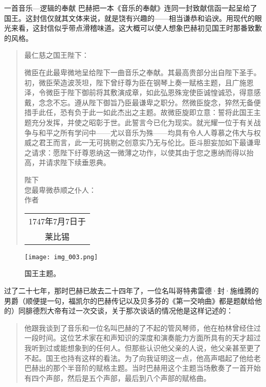 \begin{intro}{一首音乐—逻辑的奉献}
巴赫把一本《音乐的奉献》连同一封致献信函一起呈给了国王。这封信仅就其文体来说，就是饶有兴趣的——相当谦恭和谄谀。用现代的眼光来看，这封信似乎带点滑稽味道。这大概可以使人想象巴赫初见国王时那番致歉的风格。
\begin{quote}
最仁慈之国王陛下：

微臣在此最卑微地呈给陛下一曲音乐之奉献。其最高贵部分出自陛下圣手。初，微臣荣造波茨坦，陛下曾纡尊为臣在钢琴上奏一赋格主题，且广施恩泽，令微臣于陛下御前将其敷演成章，如此弘恩殊宠使臣诚惶诚恐，得意感戴，念念不忘。遵从陛下御旨乃臣最谦卑之职分。然微臣旋念，猝然无备便措手此任，恐有负于此一如此杰出之主题。故微臣旋即立意：誓将此国王主题充分发挥，并使之昭彰于世。此誓言今已化为现实。就光耀一位于有关战争与和平之所有学问中——尤以音乐为殊——均具有令人人尊慕之伟大与权威之君王而言，此一无可挑剔之创意实乃无与伦比。臣斗胆妄加如下最谦卑之请求：愿陛下纡尊恩纳这一微薄之功作，以使其由于您之惠纳而得以抬高，并请求陛下续垂恩典。

\begin{signature}[l]
陛下\\
\qquad 您最卑微恭顺之仆人：\\
\qquad\qquad 作者
\end{signature}
\nopagebreak\begin{tabular}[b]{c}
1747年7月7日于\\
莱比锡
\end{tabular}
\end{quote}

\begin{figure}
\texttt{[image: img\_003.png]}
\caption{国王主题。}
\end{figure}

过了二十七年，那时巴赫已故去二十四年了，一位名叫哥特弗雷德·封·施维腾的男爵（顺便提一句，福凯尔的巴赫传记以及贝多芬的《第一交响曲》都是题献给他的）同腓德烈大帝有过一次交谈，关于那次谈话的情况他是这样记述的：

\begin{quote}
他跟我谈到了音乐和一位名叫巴赫的了不起的管风琴师，他在柏林曾经住过一段时间。这位艺术家在和声知识的深度和演奏能力方面所具有的天才超过我听到过或能想象到的任何人。但那些认识他父亲的人说，他父亲甚至更了不起。国王也持有这样的看法。为了向我证明这一点，他高声唱起了他给老巴赫出的那个半音阶的赋格主题。当时巴赫用这个主题当场敷奏了一首开始有四个声部，然后是五个声部，最后到八个声部的赋格曲。
\end{quote}


\end{intro}
